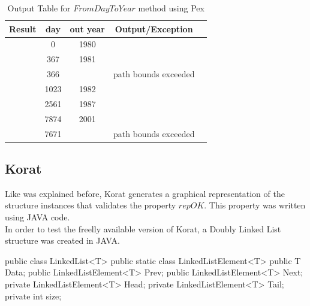 \begin{code}
\begin{table}[!ht]
\renewcommand{\arraystretch}{1.3}
\centering
\noindent \begin{tabular}{|c|c|c|c|c|}\hline
\textbf{Result} & \textbf{day} & \textbf{out year} & \textbf{Output/Exception}\\\hline
\checkK & 0 & 1980 & \\\hline
\checkK & 367 & 1981 & \\\hline
\bigexclaim & 366 & & path bounds exceeded\\\hline
\checkK & 1023 & 1982 &\\\hline
\checkK & 2561 & 1987 & \\\hline
\checkK & 7874 & 2001 & \\\hline
\bigexclaim &  7671 & & path bounds exceeded\\\hline
\end{tabular}
\caption{Output Table for $FromDayToYear$ method using Pex}\label{tab:leap}
\end{table}

\subsection{Korat}
Like was explained before, Korat generates a graphical representation of the structure instances that validates the property $repOK$. This property was written using JAVA code.\\
In order to test the freelly available version of Korat, a Doubly Linked List structure was created in JAVA.

\begin{code}
public class LinkedList<T> {
  public static class LinkedListElement<T> {
    public T Data;
    public LinkedListElement<T> Prev;
    public LinkedListElement<T> Next;
  }
  private LinkedListElement<T> Head;
  private LinkedListElement<T> Tail;
  private int size; 
}
\end{code}

\def\t#1#2#3#4{\langle#1 \ #2 : #3 \ : #4 \ \rangle}
\def\d#1#2#3{\langle#1 \ #2 :: #3 \ \rangle}
\newcommand{\subseteqL}{\mathbin{\subseteq\mkern-4mu\subseteq}}
\newcommand{\inL}{\mathbin{\in\mkern-4mu\in}}


\end{code}
